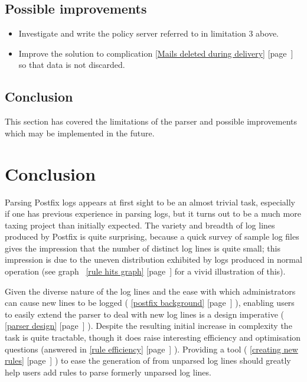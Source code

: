 \documentclass[a4paper,12pt,draft]{article}
\newcommand{\refwithpage}[1]{%
    \empty{}\ref{#1} [page~\pageref{#1}]%
}
\newcommand{\sectionref}[1]{%
    \textsection{}\refwithpage{#1}%
}
\begin{document}
\subsection{Possible improvements}

\begin{itemize}

    \item Investigate and write the policy server referred to in limitation
        3 above.

    \item Improve the solution to complication \sectionref{Mails deleted
        during delivery} so that data is not discarded.

\end{itemize}

\subsection{Conclusion}

This section has covered the limitations of the parser and possible
improvements which may be implemented in the future.

\newpage
\section{Conclusion}

\label{conclusion}

Parsing Postfix logs appears at first sight to be an almost trivial task,
especially if one has previous experience in parsing logs, but it turns out
to be a much more taxing project than initially expected.  The variety and
breadth of log lines produced by Postfix is quite surprising, because a
quick survey of sample log files gives the impression that the number of
distinct log lines is quite small; this impression is due to the uneven
distribution exhibited by logs produced in normal operation (see
graph~\refwithpage{rule hits graph} for a vivid illustration of this).  


Given the diverse nature of the log lines and the ease with which
administrators can cause new lines to be logged (\sectionref{postfix
background}), enabling users to easily extend the parser to deal with new
log lines is a design imperative (\sectionref{parser design}).  Despite the
resulting initial increase in complexity the task is quite tractable,
though it does raise interesting efficiency and optimisation questions
(answered in \sectionref{rule efficiency}).  Providing a tool
(\sectionref{creating new rules}) to ease the generation of \regexes{} from
unparsed log lines should greatly help users add rules to parse formerly
unparsed log lines.
\end{document}
